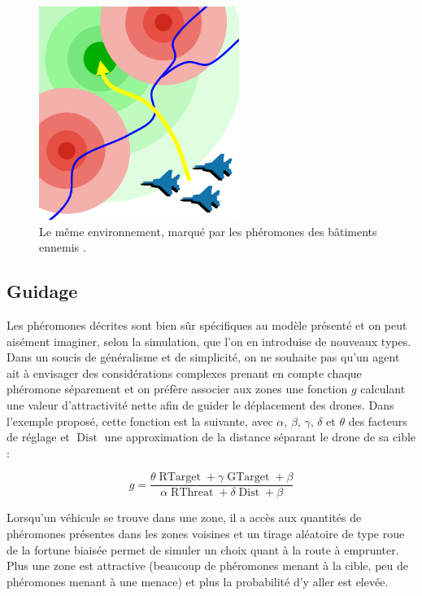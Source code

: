 \documentclass[12pt]{article}
\begin{document}
\begin{figure}[H]
  \centering

  \includegraphics[width=6.5cm]{terrain_field.png}

  \caption{Le même environnement, marqué par les phéromones des
    bâtiments ennemis \cite{parunak}.}
  \label{field}
\end{figure}

\subsection{Guidage}

Les phéromones décrites sont bien sûr spécifiques au modèle présenté
et on peut aisément imaginer, selon la simulation, que l'on en
introduise de nouveaux types. Dans un soucis de généralisme et de
simplicité, on ne souhaite pas qu'un agent ait à envisager des
considérations complexes prenant en compte chaque phéromone séparement
et on préfère associer aux zones une fonction $g$ calculant une valeur
d'attractivité nette afin de guider le déplacement des drones. Dans
l'exemple proposé, cette fonction est la suivante, avec $\alpha$,
$\beta$, $\gamma$, $\delta$ et $\theta$ des facteurs de réglage et
$\operatorname{Dist}$ une approximation de la distance séparant le
drone de sa cible :

\begin{equation}
  g = \frac{ \theta \operatorname{RTarget} + \gamma
  \operatorname{GTarget} + \beta}{\alpha \operatorname{RThreat} + \delta
  \operatorname{Dist} + \beta}
  \label{g}
\end{equation}

Lorsqu'un véhicule se trouve dans une zone, il a accès aux quantités
de phéromones présentes dans les zones voisines et un tirage aléatoire
de type roue de la fortune biaisée permet de simuler un choix quant à
la route à emprunter. Plus une zone est attractive (beaucoup de
phéromones menant à la cible, peu de phéromones menant à une menace)
et plus la probabilité d'y aller est elevée.
\end{document}
